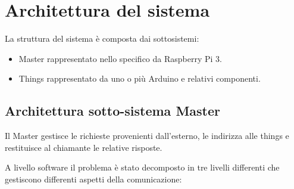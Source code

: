 \documentclass[11pt,a4paper]{article}
\begin{document}
\begin{abstract}
\begin{itemize}
\end{itemize}

L'analisi delle prestazioni del sistema verr\`a discussa con maggiore precisione nelle sezioni successive, per ora ci siamo limitati a descrivere logicamente il sistema.

Nella prossima sezione verranno discusse le scelte relative all'architettura delle sottoparti del sistema con maggior dettaglio.

\end{abstract}

\newpage

\section{Architettura del sistema}

La struttura del sistema \`e composta dai sottosistemi:

\begin{itemize}

\item Master rappresentato nello specifico da Raspberry Pi 3.

\item Things rappresentato da uno o pi\`u Arduino e relativi componenti.

\end{itemize}

\subsection{Architettura sotto-sistema Master}

Il Master gestisce le richieste provenienti dall'esterno, le indirizza alle things e restituisce al chiamante le relative risposte.

A livello software il problema \`e stato decomposto in tre livelli differenti che gestiscono differenti aspetti della comunicazione:
\end{document}
